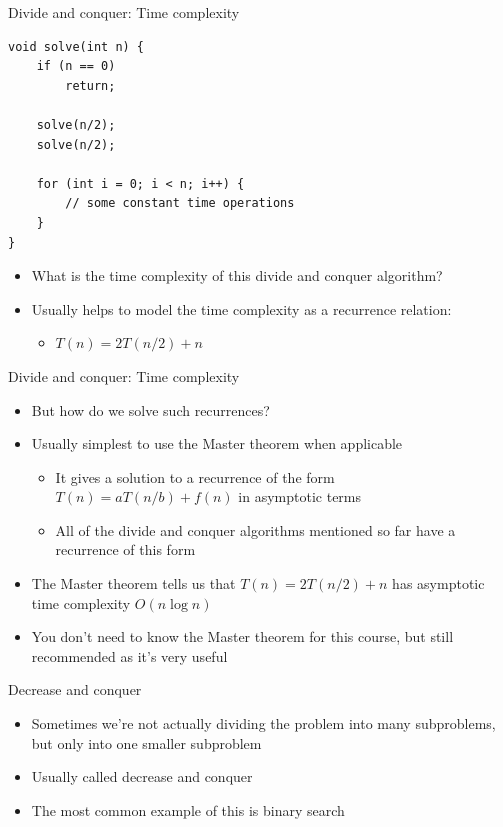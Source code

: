 \documentclass[10pt]{beamer}
\newcommand{\bi}{\begin{itemize}}
\newcommand{\ei}{\end{itemize}}
\begin{document}
\begin{frame}[fragile]{Divide and conquer: Time complexity}
    \begin{verbatim}
void solve(int n) {
    if (n == 0)
        return;

    solve(n/2);
    solve(n/2);

    for (int i = 0; i < n; i++) {
        // some constant time operations
    }
}
    \end{verbatim}

    \bi
        \item What is the time complexity of this divide and conquer algorithm?
        \item Usually helps to model the time complexity as a recurrence relation:
            \bi
                \item $T(n) = 2T(n/2) + n$
            \ei
    \ei
\end{frame}

\begin{frame}[fragile]{Divide and conquer: Time complexity}
    \bi
        \item But how do we solve such recurrences?
        \item Usually simplest to use the Master theorem when applicable
            \bi
                \item It gives a solution to a recurrence of the form $T(n) = aT(n/b) + f(n)$ in asymptotic terms
                \item All of the divide and conquer algorithms mentioned so far have a recurrence of this form
            \ei
        \vspace{10pt}
        \item The Master theorem tells us that $T(n) = 2T(n/2) + n$ has asymptotic time complexity $O(n \log n)$
        \vspace{10pt}
        \item You don't need to know the Master theorem for this course, but still recommended as it's very useful
    \ei
\end{frame}

\begin{frame}{Decrease and conquer}
    \bi
        \item Sometimes we're not actually dividing the problem into many subproblems, but only into one smaller subproblem
        \item Usually called decrease and conquer
        \item The most common example of this is binary search
    \ei
\end{frame}
\end{document}

